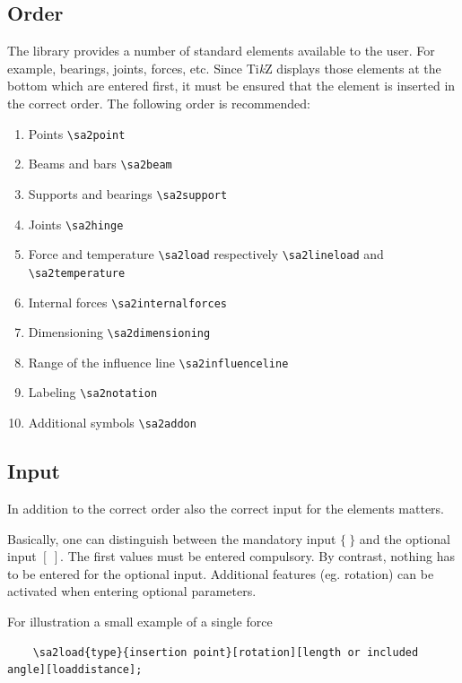 \documentclass[%
  a4paper,
  BCOR=20mm,
  numbers=noenddot,
  twoside,
  parskip=half,
  openright,
  version=last,
]{scrreprt}
\newcommand{\tikzsym}{Ti\emph{k}Z }
\begin{document}
\subsection{Order}
\label{sec:Reihenfolge}

The library provides a number of standard elements available to the user. For example, bearings, joints, forces, etc. Since \tikzsym displays those elements at the bottom which are entered first, it must be ensured that the element is inserted in the correct order. The following order is recommended:

\begin{enumerate}
	\item Points \lstinline|\sa2point|
	\item Beams and bars \lstinline|\sa2beam|
	\item Supports and bearings \lstinline|\sa2support|
	\item Joints \lstinline|\sa2hinge|
	\item Force and temperature \lstinline|\sa2load| respectively \lstinline|\sa2lineload| and \lstinline|\sa2temperature|
	\item Internal forces \lstinline|\sa2internalforces|
	\item Dimensioning \lstinline|\sa2dimensioning|
	\item Range of the influence line \lstinline|\sa2influenceline|
	\item Labeling \lstinline|\sa2notation|
	\item Additional symbols \lstinline|\sa2addon|
\end{enumerate}

\subsection{Input}
\label{sec:Eingabe}

In addition to the correct order also the correct input for the elements matters.

Basically, one can distinguish between the mandatory input $\{~\}$ and the optional input $[~]$. The first values must be entered compulsory. By contrast, nothing has to be entered for the optional input. Additional features (eg. rotation) can be activated when entering optional parameters.

For illustration a small example of a single force

\begin{lstlisting}
	\sa2load{type}{insertion point}[rotation][length or included angle][loaddistance];
\end{lstlisting} 
\end{document}
